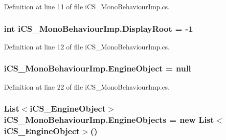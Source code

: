Definition at line 11 of file i\+C\+S\+\_\+\+Mono\+Behaviour\+Imp.\+cs.

\hypertarget{classi_c_s___mono_behaviour_imp_a6375b450d9f3ac301de2d6cb87bf8c07}{
\subsubsection[{Display\+Root}]{\setlength{\rightskip}{0pt plus 5cm}int i\+C\+S\+\_\+\+Mono\+Behaviour\+Imp.\+Display\+Root = -\/1}}\label{classi_c_s___mono_behaviour_imp_a6375b450d9f3ac301de2d6cb87bf8c07}


Definition at line 12 of file i\+C\+S\+\_\+\+Mono\+Behaviour\+Imp.\+cs.

\hypertarget{classi_c_s___mono_behaviour_imp_a26bb3c80051ff450e4fa45072ce836fc}{
\subsubsection[{Engine\+Object}]{ i\+C\+S\+\_\+\+Mono\+Behaviour\+Imp.\+Engine\+Object = null}}\label{classi_c_s___mono_behaviour_imp_a26bb3c80051ff450e4fa45072ce836fc}


Definition at line 22 of file i\+C\+S\+\_\+\+Mono\+Behaviour\+Imp.\+cs.

\hypertarget{classi_c_s___mono_behaviour_imp_a486243fbec43c4c7079b3641dfcb5112}{
\subsubsection[{Engine\+Objects}]{\setlength{\rightskip}{0pt plus 5cm}List$<${\bf i\+C\+S\+\_\+\+Engine\+Object}$>$ i\+C\+S\+\_\+\+Mono\+Behaviour\+Imp.\+Engine\+Objects = new List$<${\bf i\+C\+S\+\_\+\+Engine\+Object}$>$()}}\label{classi_c_s___mono_behaviour_imp_a486243fbec43c4c7079b3641dfcb5112}


